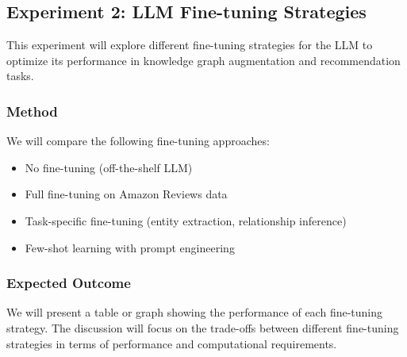 \documentclass{article}
\begin{document}



\subsection{Experiment 2: LLM Fine-tuning Strategies}

This experiment will explore different fine-tuning strategies for the LLM to optimize its performance in knowledge graph augmentation and recommendation tasks.

\subsubsection{Method}
We will compare the following fine-tuning approaches:
\begin{itemize}
    \item No fine-tuning (off-the-shelf LLM)
    \item Full fine-tuning on Amazon Reviews data
    \item Task-specific fine-tuning (entity extraction, relationship inference)
    \item Few-shot learning with prompt engineering
\end{itemize}

\subsubsection{Expected Outcome}
We will present a table or graph showing the performance of each fine-tuning strategy. The discussion will focus on the trade-offs between different fine-tuning strategies in terms of performance and computational requirements.
\end{document}
